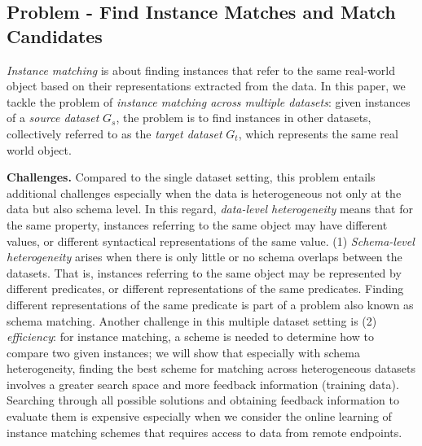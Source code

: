 \subsection{Problem - Find Instance Matches and Match Candidates} \emph{Instance matching} is about finding instances that refer to the same real-world object based on their representations extracted from the data. In this paper, we tackle the problem of \emph{instance matching across multiple datasets}: given instances of a \emph{source dataset} $G_s$, the problem is to find instances in other datasets, collectively referred to as the \emph{target dataset} $G_t$, which represents the same real world object. 

\textbf{Challenges.} Compared to the single dataset setting, this problem entails additional challenges especially when the data is heterogeneous not only at the data but also schema level. In this regard, \emph{data-level heterogeneity} means that for the same property, instances referring to the same object may have different values, or different syntactical representations of the same value.  (1) \emph{Schema-level heterogeneity} arises when there is only little or no schema overlaps between the datasets. That is, instances referring to the same object may be represented by different predicates, or different representations of the same predicates. Finding different representations of the same predicate is part of a problem also known as schema matching. Another challenge in this multiple dataset setting is (2) \emph{efficiency}: for instance matching, a scheme is needed to determine how to compare two given instances; we will show that especially with schema heterogeneity, finding the best scheme for matching across heterogeneous datasets involves a greater search space and more feedback information (training data). Searching through all possible solutions and obtaining feedback information to evaluate them is expensive especially when we consider the online learning of instance matching schemes that requires access to data from remote endpoints. 

